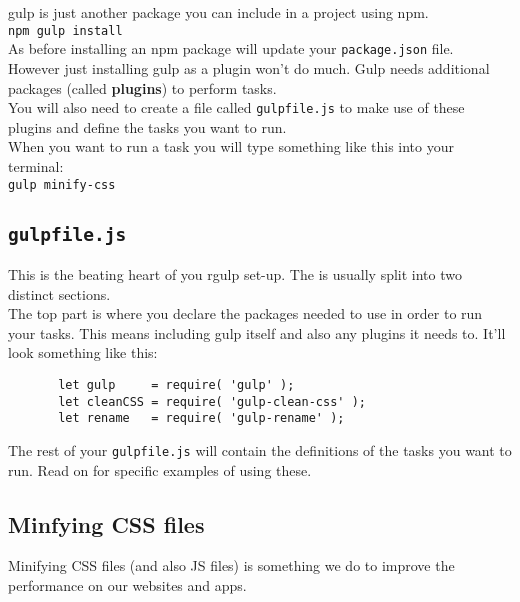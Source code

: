gulp is just another package you can include in a project using npm.
\\

\texttt{npm gulp install}
\\

As before installing an npm package will update your \texttt{package.json} file.
\\

However just installing gulp as a plugin won't do much. Gulp needs additional packages (called \textbf{plugins}) to perform tasks.
\\

You will also need to create a file called \texttt{gulpfile.js} to make use of these plugins and define the tasks you want to run.
\\

When you want to run a task you will type something like this into your terminal:
\\

\texttt{gulp minify-css}


\subsection{\texttt{gulpfile.js}}

This is the beating heart of you rgulp set-up. The is usually split into two distinct sections.
\\

The top part is where you declare the packages needed to use in order to run your tasks. This means including gulp itself and also any plugins it needs to. It'll look something like this:
\\

	\begin{verbatim}
       let gulp     = require( 'gulp' );
       let cleanCSS = require( 'gulp-clean-css' );
       let rename   = require( 'gulp-rename' );
	\end{verbatim}

The rest of your \texttt{gulpfile.js} will contain the definitions of the tasks you want to run. Read on for specific examples of using these.
\\

\subsection{Minfying CSS files}

Minifying CSS files (and also JS files) is something we do to improve the performance on our websites and apps. 
\\

